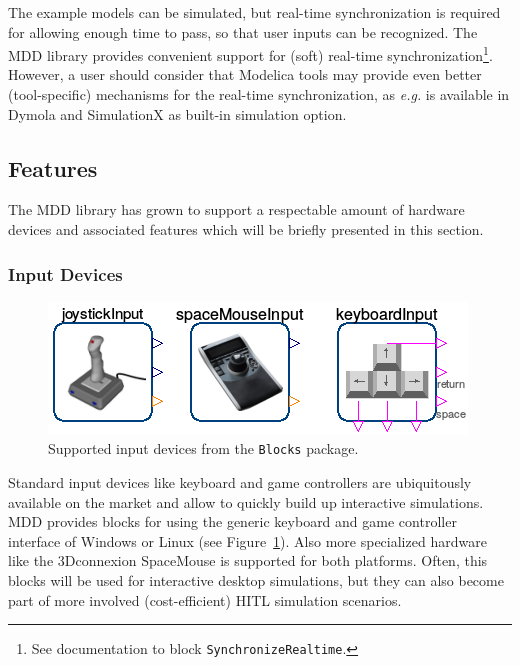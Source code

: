 \documentclass{resources/modelica}
\newcommand{\modelica}[1]{\lstinline[language=modelica]|#1|}
\begin{document}
The example models can be simulated, but real-time synchronization is
required for allowing enough time to pass, so that user inputs can be
recognized.
The MDD library provides convenient support for (soft) real-time
synchronization\footnote{See documentation to block
\mbox{\modelica{SynchronizeRealtime}.}
}.
However, a user should consider that Modelica tools may provide even better (tool-specific) mechanisms for the real-time synchronization, as \textit{e.g.} is available in Dymola and SimulationX as built-in simulation option.

\subsection{Features}

The MDD library has grown to support a respectable amount of hardware devices
and associated features which will be briefly presented in this section.

\subsubsection{Input Devices}

\begin{figure}[htb]
  \centering
  \includegraphics[width=0.7\columnwidth]{figures/OverviewInputDevices}
  \caption{Supported input devices from the \modelica{Blocks} package.}
  \label{fig:OverviewInputDevices}
\end{figure}

Standard input devices like keyboard and game controllers are ubiquitously
available on the market and allow to quickly build up interactive simulations.
MDD provides blocks for using the generic keyboard and game controller interface
of Windows or Linux (see Figure~\ref{fig:OverviewInputDevices}). Also more
specialized hardware like the 3Dconnexion SpaceMouse is supported for both platforms.
Often, this blocks will be used for interactive desktop simulations, but they
can also become part of more involved (cost-efficient) HITL simulation
scenarios.
\end{document}
